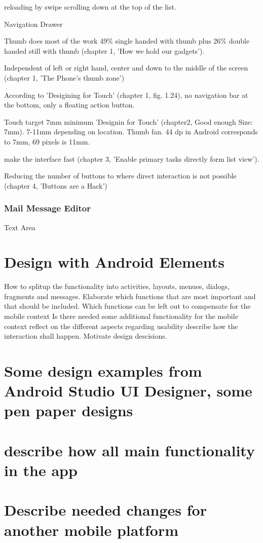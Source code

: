 \documentclass[a4paper,11pt,twoside]{article}
\begin{document}
reloading by swipe scrolling down at the top of the list.

Navigation Drawer

Thumb does most of the work 49\% single handed with thumb plus 26\% double
handed still with thumb (chapter 1, 'How we hold our gadgets').

Independent of left or right hand, center and down to the middle of the screen (chapter 1, 'The Phone's thumb zone')

According to 'Desigining for Touch' (chapter 1, fig. 1.24), no navigation bar at the bottom, only
a floating action button.

Touch target 7mm minimum 'Designin for Touch' (chapter2, Good enough Size: 7mm).
7-11mm depending on location. Thumb fan. 44 dp in Android corresponds to 7mm,
69 pixels is 11mm.

make the interface fast (chapter 3, 'Enable primary tasks directly form list view').

Reducing the number of buttons to where direct interaction is not possible (chapter 4, 'Buttons are a Hack')

\subsubsection{Mail Message Editor}
Text Area



\section{Design with Android Elements}
How to splitup the functionality into activities, layouts, menues, dialogs, fragments and messages.
Elaborate which functions that are most important and that should be included.
Which functions can be left out to compensate for the mobile context
Is there needed some additional functionality for the mobile context
reflect on the different aspects regarding usability
describe how the interaction shall happen.
Motivate design descisions.

\section{Some design examples from Android Studio UI Designer, some pen paper designs}

\section{describe how all main functionality in the app}


\section{Describe needed changes for another mobile platform}



\end{document}
